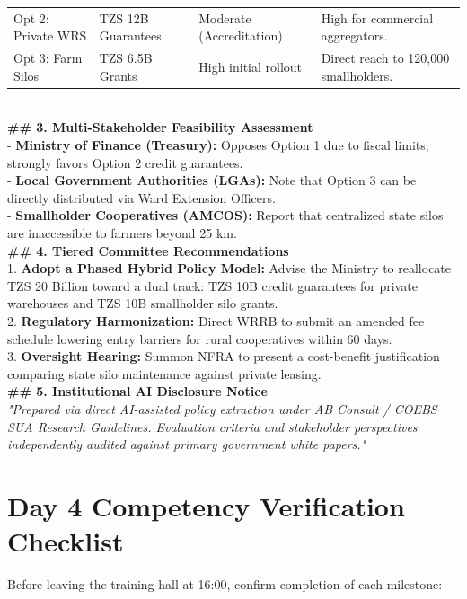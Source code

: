 \documentclass[11pt, a4paper]{report}
\begin{document}
\begin{tcolorbox}[colback=lightgrey, colframe=bordergrey, title=\textbf{Deliverable 4 Preview: \texttt{Day4\_Strategic\_Policy\_Options.md}}]
\begin{tabular}{p{2.2cm}p{2.6cm}p{3.2cm}p{3.8cm}}
Opt 2: Private WRS & TZS 12B Guarantees & Moderate (Accreditation) & High for commercial aggregators. \\
Opt 3: Farm Silos & TZS 6.5B Grants & High initial rollout & Direct reach to 120,000 smallholders. \\
\bottomrule
\end{tabular}\\[0.2cm]
\textbf{\#\# 3. Multi-Stakeholder Feasibility Assessment}\\
- \textbf{Ministry of Finance (Treasury):} Opposes Option 1 due to fiscal limits; strongly favors Option 2 credit guarantees.\\
- \textbf{Local Government Authorities (LGAs):} Note that Option 3 can be directly distributed via Ward Extension Officers.\\
- \textbf{Smallholder Cooperatives (AMCOS):} Report that centralized state silos are inaccessible to farmers beyond 25 km.\\[0.2cm]
\textbf{\#\# 4. Tiered Committee Recommendations}\\
1. \textbf{Adopt a Phased Hybrid Policy Model:} Advise the Ministry to reallocate TZS 20 Billion toward a dual track: TZS 10B credit guarantees for private warehouses and TZS 10B smallholder silo grants.\\
2. \textbf{Regulatory Harmonization:} Direct WRRB to submit an amended fee schedule lowering entry barriers for rural cooperatives within 60 days.\\
3. \textbf{Oversight Hearing:} Summon NFRA to present a cost-benefit justification comparing state silo maintenance against private leasing.\\[0.2cm]
\textbf{\#\# 5. Institutional AI Disclosure Notice}\\
\textit{"Prepared via direct AI-assisted policy extraction under AB Consult / COEBS SUA Research Guidelines. Evaluation criteria and stakeholder perspectives independently audited against primary government white papers."}
\end{tcolorbox}

\section{Day 4 Competency Verification Checklist}
Before leaving the training hall at 16:00, confirm completion of each milestone:
\end{document}
